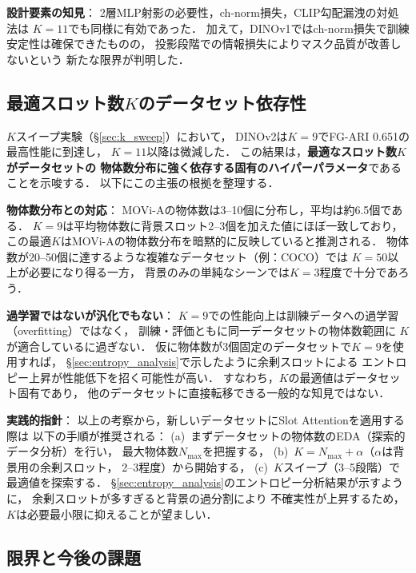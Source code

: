 \documentclass[dvipdfmx,twocolumn]{jarticle}
\begin{document}
\textbf{設計要素の知見}：
2層MLP射影の必要性，ch-norm損失，CLIP勾配漏洩の対処法は
$K{=}11$でも同様に有効であった．
加えて，DINOv1ではch-norm損失で訓練安定性は確保できたものの，
投影段階での情報損失によりマスク品質が改善しないという
新たな限界が判明した．

\subsection{最適スロット数$K$のデータセット依存性}
\label{sec:k_dependency}

$K$スイープ実験（§\ref{sec:k_sweep}）において，
DINOv2は$K{=}9$でFG-ARI 0.651の最高性能に到達し，
$K{=}11$以降は微減した．
この結果は，\textbf{最適なスロット数$K$がデータセットの
物体数分布に強く依存する固有のハイパーパラメータ}であることを示唆する．
以下にこの主張の根拠を整理する．

\textbf{物体数分布との対応}：
MOVi-Aの物体数は3--10個に分布し，平均は約6.5個である．
$K{=}9$は平均物体数に背景スロット2--3個を加えた値にほぼ一致しており，
この最適$K$はMOVi-Aの物体数分布を暗黙的に反映していると推測される．
物体数が20--50個に達するような複雑なデータセット（例：COCO）では
$K{=}50$以上が必要になり得る一方，
背景のみの単純なシーンでは$K{=}3$程度で十分であろう．

\textbf{過学習ではないが汎化でもない}：
$K{=}9$での性能向上は訓練データへの過学習（overfitting）ではなく，
訓練・評価ともに同一データセットの物体数範囲に
$K$が適合しているに過ぎない．
仮に物体数が3個固定のデータセットで$K{=}9$を使用すれば，
§\ref{sec:entropy_analysis}で示したように余剰スロットによる
エントロピー上昇が性能低下を招く可能性が高い．
すなわち，$K$の最適値はデータセット固有であり，
他のデータセットに直接転移できる一般的な知見ではない．

\textbf{実践的指針}：
以上の考察から，新しいデータセットにSlot Attentionを適用する際は
以下の手順が推奨される：
(a)~まずデータセットの物体数のEDA（探索的データ分析）を行い，
最大物体数$N_\mathrm{max}$を把握する，
(b)~$K{=}N_\mathrm{max}+\alpha$（$\alpha$は背景用の余剰スロット，
2--3程度）から開始する，
(c)~$K$スイープ（3--5段階）で最適値を探索する．
§\ref{sec:entropy_analysis}のエントロピー分析結果が示すように，
余剰スロットが多すぎると背景の過分割により
不確実性が上昇するため，$K$は必要最小限に抑えることが望ましい．

\subsection{限界と今後の課題}
\end{document}
